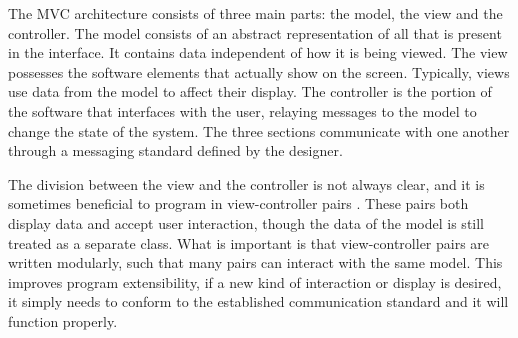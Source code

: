 The MVC architecture consists of three main parts: the model, the view and the controller. The model consists of an abstract representation of all that is present in the interface. It contains data independent of how it is being viewed. The view possesses the software elements that actually show on the screen. Typically, views use data from the model to affect their display. The controller is the portion of the software that interfaces with the user, relaying messages to the model to change the state of the system. The three sections communicate with one another through a messaging standard defined by the designer. 

The division between the view and the controller is not always clear, and it is sometimes beneficial to program in view-controller pairs \cite{MVC_krasnerpope}. These pairs both display data and accept user interaction, though the data of the model is still treated as a separate class. What is important is that view-controller pairs are written modularly, such that many pairs can interact with the same model. This improves program extensibility, if a new kind of interaction or display is desired, it simply needs to conform to the established communication standard and it will function properly.


	